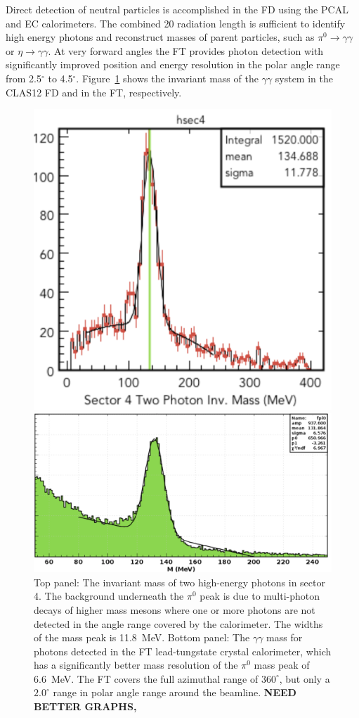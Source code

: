 \documentclass[final,3p,twocolumn]{elsarticle}
\begin{document}
Direct detection of neutral particles is accomplished in the FD using the PCAL and EC calorimeters. 
The combined 20 radiation length is sufficient to identify high energy photons and reconstruct masses 
of parent particles, such as $\pi^0\to \gamma \gamma$  or $\eta \to \gamma \gamma$. 
 At very forward angles the FT provides photon detection with significantly improved position and 
 energy resolution in the polar angle range from 2.5$^\circ$ to 4.5$^\circ$. Figure~\ref{gg} 
shows the invariant mass of the $\gamma\gamma$ system in the CLAS12 FD and in the FT, respectively. 

\begin{figure}[htbp!]
\centerline{\includegraphics[width=0.95\columnwidth]{pi0.png}}
\centerline{\includegraphics[width=0.9\columnwidth]{ft-pi0.png}}
\caption{Top panel: The invariant mass of two high-energy photons in sector 4. The background underneath the 
$\pi^0$ peak is due to multi-photon decays of higher mass mesons where one or more photons 
are not detected in the angle range covered by the calorimeter. The widths of the mass peak is 11.8~MeV. 
Bottom panel: The $\gamma\gamma$ mass for photons detected in the FT lead-tungstate crystal calorimeter, which 
has a significantly better mass resolution of the $\pi^0$ mass peak of 6.6~MeV. The FT covers the full azimuthal range of $360^\circ$, 
but only a $2.0^\circ$ range in polar angle range around the beamline.  
{\bf NEED BETTER GRAPHS, }} 
\label{gg}
\end{figure}
\end{document}
